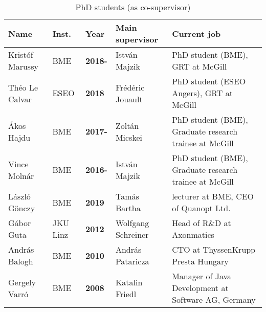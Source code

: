 \begin{table}[htb]
\footnotesize
\begin{tabular}{@{}llllp{8cm}@{}}
\toprule
\textbf{Name} & \textbf{Inst.} & \textbf{Year} & \textbf{Main supervisor} & \textbf{Current job} \\ \midrule
Krist\'of Marussy & BME & \textbf{2018-}  & Istv\'an Majzik & PhD student (BME), GRT at McGill \\
Th\'eo Le Calvar & ESEO & \textbf{2018}  & Fr\'ed\'eric Jouault & PhD student (ESEO Angers), GRT at McGill \\
\'Akos Hajdu & BME & \textbf{2017-}  & Zolt\'an Micskei & PhD student (BME), Graduate research trainee at McGill \\
Vince Moln\'ar & BME & \textbf{2016-}  & Istv\'an Majzik & PhD student (BME), Graduate research trainee at McGill \\ \midrule
L\'aszl\'o G\"onczy & BME & \textbf{2019}  & Tam\'as Bartha & lecturer at BME, CEO of Quanopt Ltd.\\
G\'abor Guta & JKU Linz & \textbf{2012}  & Wolfgang Schreiner & Head of R\&D at Axonmatics \\
Andr\'as Balogh & BME & \textbf{2010}  & Andr\'as Pataricza & CTO at ThyssenKrupp Presta Hungary \\
Gergely Varr\'o & BME & \textbf{2008}  & Katalin Friedl & Manager of Java Development at Software AG, Germany \\ \bottomrule
\end{tabular}
\caption{PhD students (as co-supervisor)}
\label{tab:phd-cosupervised}
\end{table}

